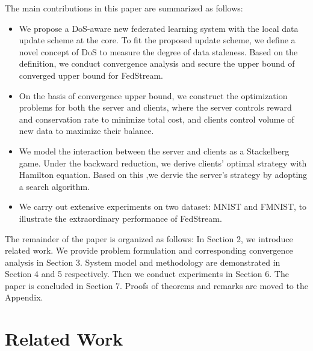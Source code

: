 \documentclass{article}
\theoremstyle{plain}
\theoremstyle{definition}
\theoremstyle{remark}
\begin{document}
The main contributions in this paper are summarized as follows:
\begin{itemize}
  \item We propose a DoS-aware new federated learning system with the local data update scheme at the core. To fit the proposed update scheme, we define a novel concept of DoS to measure the degree of data staleness. Based on the definition, we conduct convergence analysis and secure the upper bound of converged upper bound for FedStream.
  \item On the basis of convergence upper bound, we construct the optimization problems for both the server and clients, where the server controls reward and conservation rate to minimize total cost, and clients control volume of new data to maximize their balance.
  \item We model the interaction between the server and clients as a Stackelberg game. Under the backward reduction, we derive clients' optimal strategy with Hamilton equation. Based on this ,we dervie the server's strategy by adopting a search algorithm.
  \item We carry out extensive experiments on two dataset: MNIST and FMNIST, to illustrate the extraordinary performance of FedStream.
\end{itemize}
The remainder of the paper is organized as follows: In Section 2, we introduce related work. We provide problem formulation and corresponding convergence analysis in Section 3. System model and methodology are demonstrated in Section 4 and 5 respectively. Then we conduct experiments in Section 6. The paper is concluded in Section 7.
Proofs of theorems and remarks are moved to the Appendix.

\section{Related Work}
\label{Related Work}
\end{document}
